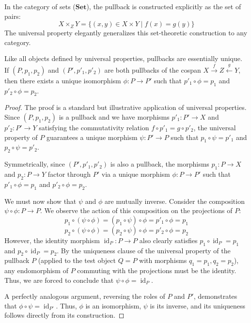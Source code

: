 In the category of sets ($\mathbf{Set}$), the pullback is constructed explicitly as the set of pairs:
\[
X \times_Z Y = \{ (x, y) \in X \times Y \mid f(x) = g(y) \}
\]
The universal property elegantly generalizes this set-theoretic construction to any category.

\begin{lemma}
\label{lem:pullback_uniqueness}
Like all objects defined by universal properties, pullbacks are essentially unique. If $(P, p_1, p_2)$ and $(P', p'_1, p'_2)$ are both pullbacks of the cospan $X \xrightarrow{f} Z \xleftarrow{g} Y$, then there exists a unique isomorphism $\phi: P \to P'$ such that $p'_1 \circ \phi = p_1$ and $p'_2 \circ \phi = p_2$.
\end{lemma}

\begin{proof}
The proof is a standard but illustrative application of universal properties. 
Since $(P, p_1, p_2)$ is a pullback and we have morphisms $p'_1: P' \to X$ and $p'_2: P' \to Y$ satisfying the commutativity relation $f \circ p'_1 = g \circ p'_2$, the universal property of $P$ guarantees a unique morphism $\psi: P' \to P$ such that $p_1 \circ \psi = p'_1$ and $p_2 \circ \psi = p'_2$. 

Symmetrically, since $(P', p'_1, p'_2)$ is also a pullback, the morphisms $p_1: P \to X$ and $p_2: P \to Y$ factor through $P'$ via a unique morphism $\phi: P \to P'$ such that $p'_1 \circ \phi = p_1$ and $p'_2 \circ \phi = p_2$.

We must now show that $\psi$ and $\phi$ are mutually inverse. Consider the composition $\psi \circ \phi: P \to P$. We observe the action of this composition on the projections of $P$:
\[
p_1 \circ (\psi \circ \phi) = (p_1 \circ \psi) \circ \phi = p'_1 \circ \phi = p_1
\]
\[
p_2 \circ (\psi \circ \phi) = (p_2 \circ \psi) \circ \phi = p'_2 \circ \phi = p_2
\]
However, the identity morphism $\operatorname{id}_P: P \to P$ also clearly satisfies $p_1 \circ \operatorname{id}_P = p_1$ and $p_2 \circ \operatorname{id}_P = p_2$. By the uniqueness clause of the universal property of the pullback $P$ (applied to the test object $Q=P$ with morphisms $q_1=p_1, q_2=p_2$), any endomorphism of $P$ commuting with the projections must be the identity. Thus, we are forced to conclude that $\psi \circ \phi = \operatorname{id}_P$. 

A perfectly analogous argument, reversing the roles of $P$ and $P'$, demonstrates that $\phi \circ \psi = \operatorname{id}_{P'}$. Thus, $\phi$ is an isomorphism, $\psi$ is its inverse, and its uniqueness follows directly from its construction.
\end{proof}


